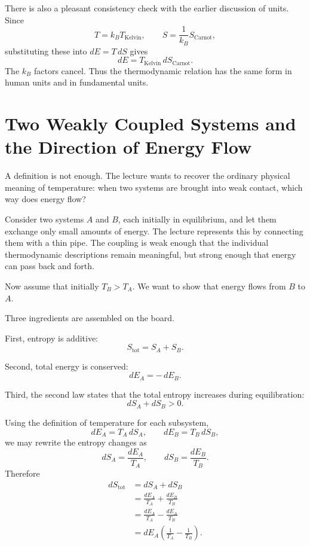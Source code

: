 There is also a pleasant consistency check with the earlier discussion of units. Since
\begin{equation}
T = k_B T_{\mathrm{Kelvin}}, \qquad S = \frac{1}{k_B}S_{\mathrm{Carnot}},
\end{equation}
substituting these into \(dE=T\,dS\) gives
\begin{equation}
dE = T_{\mathrm{Kelvin}}\, dS_{\mathrm{Carnot}}.
\end{equation}
The \(k_B\) factors cancel. Thus the thermodynamic relation has the same form in human units and in fundamental units.

\section{Two Weakly Coupled Systems and the Direction of Energy Flow}

A definition is not enough. The lecture wants to recover the ordinary physical meaning of temperature: when two systems are brought into weak contact, which way does energy flow?

Consider two systems \(A\) and \(B\), each initially in equilibrium, and let them exchange only small amounts of energy. The lecture represents this by connecting them with a thin pipe. The coupling is weak enough that the individual thermodynamic descriptions remain meaningful, but strong enough that energy can pass back and forth.

Now assume that initially \(T_B > T_A\). We want to show that energy flows from \(B\) to \(A\).

Three ingredients are assembled on the board.

First, entropy is additive:
\begin{equation}
S_{\mathrm{tot}} = S_A + S_B.
\end{equation}

Second, total energy is conserved:
\begin{equation}
dE_A = -\,dE_B.
\end{equation}

Third, the second law states that the total entropy increases during equilibration:
\begin{equation}
dS_A + dS_B > 0.
\end{equation}

Using the definition of temperature for each subsystem,
\begin{equation}
dE_A = T_A\, dS_A, \qquad dE_B = T_B\, dS_B,
\end{equation}
we may rewrite the entropy changes as
\begin{equation}
dS_A = \frac{dE_A}{T_A}, \qquad dS_B = \frac{dE_B}{T_B}.
\end{equation}
Therefore
\begin{align}
dS_{\mathrm{tot}}
  &= dS_A + dS_B \\
  &= \frac{dE_A}{T_A} + \frac{dE_B}{T_B} \\
  &= \frac{dE_A}{T_A} - \frac{dE_A}{T_B} \\
  &= dE_A\left(\frac{1}{T_A}-\frac{1}{T_B}\right).
\end{align}

